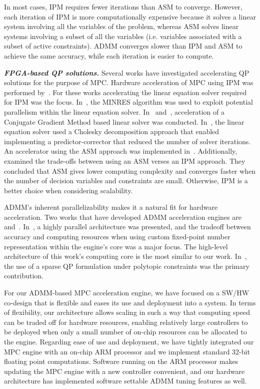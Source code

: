 In most cases, IPM requires fewer iterations than ASM to converge. However, each iteration of IPM is more computationally expensive because it solves a linear system involving all the variables of the problem, whereas ASM solves linear systems involving a subset of all the variables (i.e. variables associated with a subset of active constraints). ADMM converges slower than IPM and ASM to achieve the same accuracy, while each iteration is easier to compute.

\textbf{\textit{FPGA-based QP solutions.}}
Several works have investigated accelerating QP solutions for the purpose of MPC\cite{5681439,6376494,6927473,wills2011fpga,7074396,jerez2014embedded,7331067}. Hardware acceleration of MPC using IPM was performed by~\cite{5681439,6376494,wills2011fpga,6927473}. For these works accelerating the linear equation solver required for IPM was the focus. In~\cite{5681439}, the MINRES algorithm was used to exploit potential parallelism within the linear equation solver. In~\cite{6376494} and~\cite{wills2011fpga}, acceleration of a Conjugate Gradient Method based linear solver was conducted. In~\cite{6927473}, the linear equation solver used a Cholesky decomposition approach that enabled implementing a predictor-corrector that reduced the number of solver iterations. An accelerator using the ASM approach was implemented in~\cite{7074396}. Additionally,~\cite{7074396} examined the trade-offs between using an ASM verses an IPM approach. They concluded that ASM gives lower computing complexity and converges faster when the number of decision variables and constraints are small. Otherwise, IPM is a better choice when considering scalability.

ADMM's inherent parallelizability makes it a natural fit for hardware acceleration. Two works that have developed ADMM acceleration engines are~\cite{jerez2014embedded} and~\cite{7331067}. In~\cite{jerez2014embedded}, a highly parallel architecture was presented, and the tradeoff between accuracy and computing resources when using custom fixed-point number representation within the engine's core was a major focus. The high-level architecture of this work's computing core is the most similar to our work. In~\cite{7331067}, the use of a sparse QP formulation under polytopic constraints was the primary contribution.

For our ADMM-based MPC acceleration engine, we have focused on a SW/HW co-design that is flexible and eases its use and deployment into a system. In terms of flexibility, our architecture allows scaling in such a way that computing speed can be traded off for hardware resources, enabling relatively large controllers to be deployed when only a small number of on-chip resources can be allocated to the engine. Regarding ease of use and deployment, we have tightly integrated our MPC engine with an on-chip ARM processor and we implement standard 32-bit floating point computations. Software running on the ARM processor makes updating the MPC engine with a new controller convenient, and our hardware architecture has implemented software settable ADMM tuning features as well.
